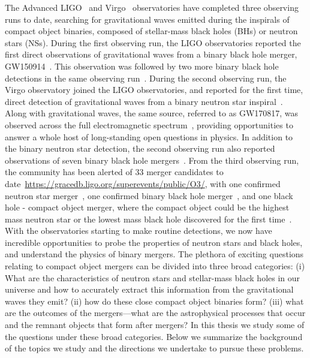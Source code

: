 The Advanced LIGO~\cite{TheLIGOScientific:2014jea} and
Virgo~\cite{TheVirgo:2014hva} observatories have completed three observing runs to date, searching for gravitational waves emitted during the inspirals of compact object
binaries, composed of stellar-mass black holes (BHs) or neutron stars (NSs). During the first observing run, the LIGO observatories reported the first direct observations of gravitational waves from a binary black hole merger, GW150914~\cite{Abbott:2016blz}. This observation was followed by two more binary black hole detections in the same observing run~\cite{TheLIGOScientific:2016pea}. During the second observing run, the Virgo observatory joined the LIGO observatories, and reported for the first time, direct detection of gravitational waves from a binary neutron star inspiral~\cite{TheLIGOScientific:2017qsa}. Along with gravitational waves, the same source, referred to as GW170817, was observed across the full electromagnetic spectrum~\cite{GBM:2017lvd}, providing opportunities to answer a whole host of long-standing open questions in physics. In addition to the binary neutron star detection, the second observing run also reported observations of seven binary black hole mergers~\cite{TheLIGOScientific:2014jea,Abbott:2017vtc,Abbott:2017gyy,LIGOScientific:2018mvr,LIGOScientific:2018mvr,LIGOScientific:2018mvr,Abbott:2017oio,LIGOScientific:2018mvr}. From the third observing run, the community has been alerted of 33 merger candidates to date~\url{https://gracedb.ligo.org/superevents/public/O3/}, with one confirmed neutron star merger~\cite{Abbott:2020uma}, one confirmed binary black hole merger~\cite{LIGOScientific:2020stg}, and one black hole - compact object merger, where the compact object could be the highest mass neutron star or the lowest mass black hole discovered for the first time~\cite{Abbott:2020khf}. With the observatories starting to make routine detections, we now have incredible opportunities to probe the properties of neutron stars and black holes, and understand the physics of binary mergers. The plethora of exciting questions relating to compact object mergers can be divided into three broad categories: (i) What are the characteristics of neutron stars and stellar-mass black holes in our universe and how to accurately extract this information from the gravitational waves they emit? (ii) how do these close compact object binaries form? (iii) what are the outcomes of the mergers---what are the astrophysical processes that occur and the remnant objects that form after mergers? In this thesis we study some of the questions under these broad categories. Below we summarize the background of the topics we study and the directions we undertake to pursue these problems.


